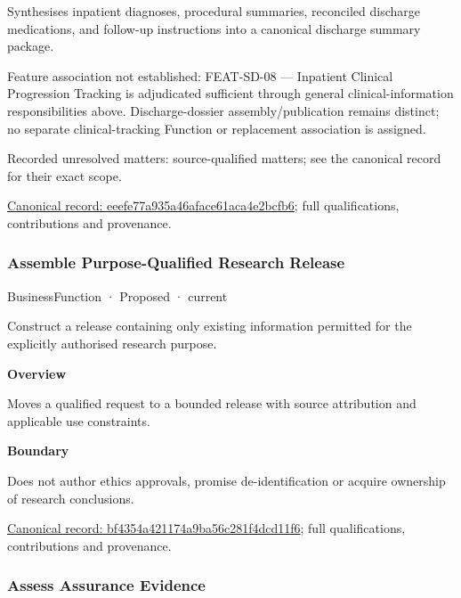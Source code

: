 Synthesises inpatient diagnoses, procedural summaries, reconciled discharge medications, and follow-up instructions into a canonical discharge summary package.



Feature association not established: FEAT-SD-08 — Inpatient Clinical Progression Tracking is adjudicated sufficient through general clinical-information responsibilities above. Discharge-dossier assembly/publication remains distinct; no separate clinical-tracking Function or replacement association is assigned.


{\small Recorded unresolved matters: source-qualified matters; see the canonical record for their exact scope.}\par
{\footnotesize \href{../../../../continuum/business/business-function/eeefe77a935a46aface61aca4e2bcfb6.md}{Canonical record: eeefe77a935a46aface61aca4e2bcfb6}; full qualifications, contributions and provenance.}\par
\subsubsection{Assemble Purpose-Qualified Research Release}

\label{element:bf4354a421174a9ba56c281f4dcd11f6}
{\small BusinessFunction · Proposed · current}\par

Construct a release containing only existing information permitted for the explicitly authorised research purpose.



\textbf{Overview}



Moves a qualified request to a bounded release with source attribution and applicable use constraints.



\textbf{Boundary}



Does not author ethics approvals, promise de-identification or acquire ownership of research conclusions.


{\footnotesize \href{../../../../continuum/business/business-function/bf4354a421174a9ba56c281f4dcd11f6.md}{Canonical record: bf4354a421174a9ba56c281f4dcd11f6}; full qualifications, contributions and provenance.}\par
\subsubsection{Assess Assurance Evidence}

